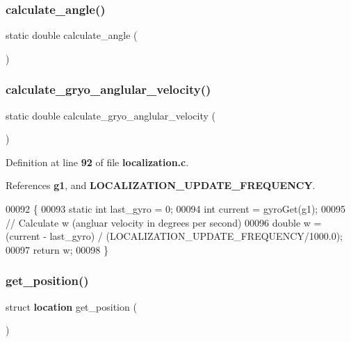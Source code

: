 \subsubsection{calculate\+\_\+angle()}
{\footnotesize\ttfamily static double calculate\+\_\+angle (\begin{DoxyParamCaption}{ }\end{DoxyParamCaption})\hspace{0.3cm}{\ttfamily [static]}}

\mbox{\label{localization_8c_aa849dcc7cd296f4556fab3b57c1c4d3e}} 
\subsubsection{calculate\+\_\+gryo\+\_\+anglular\+\_\+velocity()}
{\footnotesize\ttfamily static double calculate\+\_\+gryo\+\_\+anglular\+\_\+velocity (\begin{DoxyParamCaption}{ }\end{DoxyParamCaption})\hspace{0.3cm}{\ttfamily [static]}}



Definition at line \textbf{ 92} of file \textbf{ localization.\+c}.



References \textbf{ g1}, and \textbf{ L\+O\+C\+A\+L\+I\+Z\+A\+T\+I\+O\+N\+\_\+\+U\+P\+D\+A\+T\+E\+\_\+\+F\+R\+E\+Q\+U\+E\+N\+CY}.


\begin{DoxyCode}
00092                                                  \{
00093   \textcolor{keyword}{static} \textcolor{keywordtype}{int} last\_gyro = 0;
00094   \textcolor{keywordtype}{int} current = gyroGet(g1);
00095   \textcolor{comment}{// Calculate w (angluar velocity in degrees per second)}
00096   \textcolor{keywordtype}{double} w = (current - last\_gyro) / (LOCALIZATION_UPDATE_FREQUENCY/1000.0);
00097   \textcolor{keywordflow}{return} w;
00098 \}
\end{DoxyCode}
\mbox{\label{localization_8c_aadbff35bb757f60bc348d4d778f57a2f}} 
\subsubsection{get\+\_\+position()}
{\footnotesize\ttfamily struct \textbf{ location} get\+\_\+position (\begin{DoxyParamCaption}{ }\end{DoxyParamCaption})}



